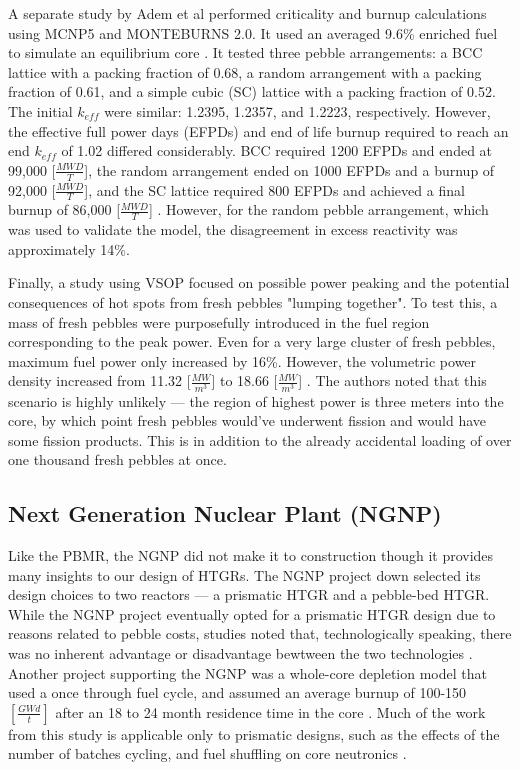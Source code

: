 A separate study by Adem et al performed criticality and burnup calculations using MCNP5 and MONTEBURNS 2.0.  It used an averaged 9.6\% enriched fuel to simulate an equilibrium core \cite{adem_criticality_2011}.  It tested three pebble arrangements:  a BCC lattice with a packing fraction of 0.68, a random arrangement with a packing fraction of 0.61, and a simple cubic (SC) lattice with a packing fraction of 0.52.  The initial $k_{eff}$ were similar: 1.2395, 1.2357, and 1.2223, respectively.  However, the effective full power days (EFPDs) and end of life burnup required to reach an end $k_{eff}$  of 1.02 differed considerably.  BCC required 1200 EFPDs and ended at 99,000 [$\frac{MWD}{T}$], the random arrangement ended on 1000 EFPDs and a burnup of 92,000 [$\frac{MWD}{T}$], and the SC lattice required 800 EFPDs and achieved a final burnup of 86,000 [$\frac{MWD}{T}$] \cite{adem_criticality_2011}.  However, for the random pebble arrangement, which was used to validate the model, the disagreement in excess reactivity was approximately 14\%.

Finally, a study using VSOP focused on possible power peaking and the potential consequences of hot spots \cite{reitsma_investigation_2005} from fresh pebbles "lumping together".  To test this, a mass of fresh pebbles were purposefully introduced in the fuel region corresponding to the peak power.  Even for a very large cluster of fresh pebbles, maximum fuel power only increased by 16\%.  However, the volumetric power density increased from 11.32 [$\frac{MW}{m^3}$] to 18.66 [$\frac{MW}{m^3}$] \cite{reitsma_investigation_2005}.  The authors noted that this scenario is highly unlikely --- the region of highest power is three meters into the core, by which point fresh pebbles would've underwent fission and would have some fission products.  This is in addition to the already accidental loading of over one thousand fresh pebbles at once.

\subsection{Next Generation Nuclear Plant (NGNP)}

Like the PBMR, the NGNP did not make it to construction though it provides many insights to our design of HTGRs.  The NGNP project down selected its design choices to two reactors --- a prismatic HTGR and a pebble-bed HTGR.  While the NGNP project eventually opted for a prismatic HTGR design due to reasons related to pebble costs, studies noted that, technologically speaking, there was no inherent advantage or disadvantage bewtween the two technologies \cite{inl_basis_2011}.  Another project supporting the NGNP was a whole-core depletion model that used a once through fuel cycle, and assumed an average burnup of 100-150 $\left[\frac{GWd}{t}\right]$ after an 18 to 24 month residence time in the core \cite{tk_kim_whole-core_2004}.  Much of the work from this study is applicable only to prismatic designs, such as the effects of the number of batches cycling, and fuel shuffling on core neutronics \cite{tk_kim_whole-core_2004}.


